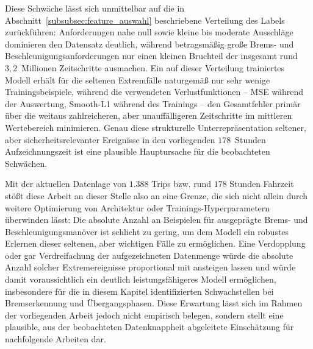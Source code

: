 Diese Schwäche lässt sich unmittelbar auf die in Abschnitt~\ref{subsubsec:feature_auswahl} beschriebene Verteilung des Labels zurückführen: Anforderungen nahe null sowie kleine bis moderate Ausschläge dominieren den Datensatz deutlich, während betragsmäßig große Brems- und Beschleunigungsanforderungen nur einen kleinen Bruchteil der insgesamt rund $3{,}2$~Millionen Zeitschritte ausmachen. Ein auf dieser Verteilung trainiertes Modell erhält für die seltenen Extremfälle naturgemäß nur sehr wenige Trainingsbeispiele, während die verwendeten Verlustfunktionen -- \gls{MSE} während der Auswertung, Smooth-L1 während des Trainings -- den Gesamtfehler primär über die weitaus zahlreicheren, aber unauffälligeren Zeitschritte im mittleren Wertebereich minimieren. Genau diese strukturelle Unterrepräsentation seltener, aber sicherheitsrelevanter Ereignisse in den vorliegenden $178$~Stunden Aufzeichnungszeit ist eine plausible Hauptursache für die beobachteten Schwächen.

Mit der aktuellen Datenlage von $1.388$ Trips bzw. rund $178$ Stunden Fahrzeit stößt diese Arbeit an dieser Stelle also an eine Grenze, die sich nicht allein durch weitere Optimierung von Architektur oder Trainings-Hyperparametern überwinden lässt: Die absolute Anzahl an Beispielen für ausgeprägte Brems- und Beschleunigungsmanöver ist schlicht zu gering, um dem Modell ein robustes Erlernen dieser seltenen, aber wichtigen Fälle zu ermöglichen. Eine Verdopplung oder gar Verdreifachung der aufgezeichneten Datenmenge würde die absolute Anzahl solcher Extremereignisse proportional mit ansteigen lassen und würde damit voraussichtlich ein deutlich leistungsfähigeres Modell ermöglichen, insbesondere für die in diesem Kapitel identifizierten Schwachstellen bei Bremserkennung und Übergangsphasen. Diese Erwartung lässt sich im Rahmen der vorliegenden Arbeit jedoch nicht empirisch belegen, sondern stellt eine plausible, aus der beobachteten Datenknappheit abgeleitete Einschätzung für nachfolgende Arbeiten dar.
